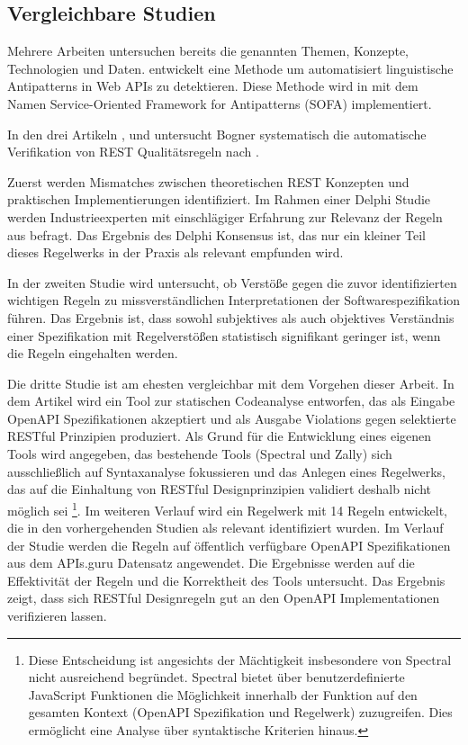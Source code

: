 \subsection{Vergleichbare Studien} \label{sec:vergleichbarestudien}
Mehrere Arbeiten untersuchen bereits die genannten Themen, Konzepte, Technologien und Daten.
\parencite{palma_semantic_2017} entwickelt eine Methode um automatisiert linguistische Antipatterns in Web \acs{API}s zu detektieren. Diese Methode wird in \parencite{palma_specification_2014} mit dem Namen Service-Oriented Framework for Antipatterns (SOFA) implementiert.

In den drei Artikeln  \parencite{kotstein_which_2021}, \parencite{bogner_restful_2023} und \parencite{bogner_restruler_2024} untersucht Bogner systematisch die automatische Verifikation von \acs{REST} Qualitätsregeln nach \parencite{masse_rest_2011}. 

Zuerst werden \glqq Mismatches zwischen theoretischen \acs{REST} Konzepten und praktischen Implementierungen\grqq{} \parencite{kotstein_which_2021} identifiziert. Im Rahmen einer Delphi Studie \parencite{kotstein_which_2021} werden Industrieexperten mit einschlägiger Erfahrung zur Relevanz der Regeln aus \parencite{masse_rest_2011} befragt. Das Ergebnis des Delphi Konsensus ist, das nur ein kleiner Teil dieses Regelwerks in der Praxis als relevant empfunden wird. 

In der zweiten Studie \parencite{bogner_restful_2023} wird untersucht, ob Verstöße gegen die zuvor identifizierten wichtigen Regeln zu missverständlichen Interpretationen der Softwarespezifikation führen. Das Ergebnis ist, dass sowohl subjektives als auch objektives Verständnis einer Spezifikation mit Regelverstößen statistisch signifikant geringer ist, wenn die Regeln eingehalten werden. 

Die dritte Studie ist am ehesten vergleichbar mit dem Vorgehen dieser Arbeit. In dem Artikel wird ein Tool zur statischen Codeanalyse entworfen, das als Eingabe OpenAPI Spezifikationen akzeptiert und als Ausgabe Violations gegen selektierte \acs{REST}ful Prinzipien produziert. Als Grund für die Entwicklung eines eigenen Tools wird angegeben, das bestehende Tools (Spectral und Zally) sich ausschließlich auf Syntaxanalyse fokussieren und das Anlegen eines Regelwerks, das auf die Einhaltung von \acs{REST}ful Designprinzipien validiert deshalb nicht möglich sei \parencite{bogner_restruler_2024}\footnote{Diese Entscheidung ist angesichts der Mächtigkeit insbesondere von Spectral nicht ausreichend begründet. Spectral bietet über benutzerdefinierte JavaScript Funktionen die Möglichkeit innerhalb der Funktion auf den gesamten Kontext (OpenAPI Spezifikation und Regelwerk) zuzugreifen. Dies ermöglicht eine Analyse über syntaktische Kriterien hinaus.}. Im weiteren Verlauf wird ein Regelwerk mit 14 Regeln entwickelt, die in den vorhergehenden Studien als relevant identifiziert wurden. Im Verlauf der Studie werden die Regeln auf öffentlich verfügbare OpenAPI Spezifikationen aus dem APIs.guru Datensatz angewendet. Die Ergebnisse werden auf die Effektivität der Regeln und die Korrektheit des Tools untersucht. Das Ergebnis zeigt, dass sich \acs{REST}ful Designregeln gut an den OpenAPI Implementationen verifizieren lassen.

